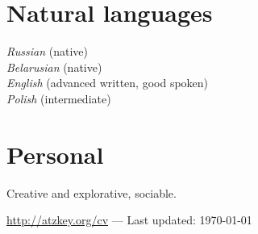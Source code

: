\documentclass[12pt, a4paper]{article}
\begin{document}
  \section*{Natural languages}
  \textit{Russian} (native)\\
  \textit{Belarusian} (native)\\
  \textit{English} (advanced written, good spoken)\\
  \textit{Polish} (intermediate)

  \section*{Personal}
  Creative and explorative, sociable.

  \vfill{}
  \hrulefill
  \begin{center}
    \footnotesize \href{http://atzkey.org/cv}{http://atzkey.org/cv} — Last updated: \today
  \end{center}
\end{document}

